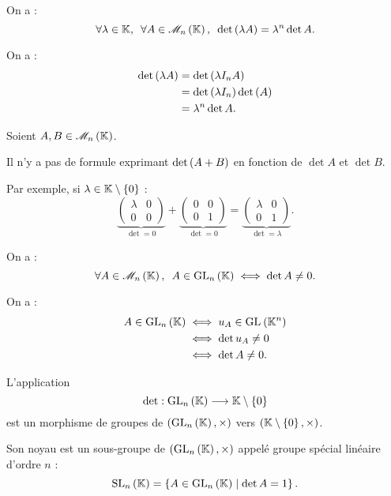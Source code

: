 \begin{prop}
On a : \[\quantifs{\forall\lambda\in\K;\forall A\in\M{n}}\det\paren{\lambda A}=\lambda^n\det A.\]
\end{prop}

\begin{dem}
On a : \[\begin{aligned}
\det\left(\lambda A\right)&=\det\left(\lambda I_nA\right) \\
&=\det\left(\lambda I_n\right)\det\left(A\right) \\
&=\lambda^n\det A.
\end{aligned}\]
\end{dem}

\begin{rem}
Soient \(A,B\in\M{n}\).

Il n'y a pas de formule exprimant \(\det\left(A+B\right)\) en fonction de \(\det A\) et \(\det B\).

Par exemple, si \(\lambda\in\mathbb{K}\setminus\left\lbrace0\right\rbrace\) : \[\underbrace{\begin{pmatrix}
\lambda & 0 \\
0 & 0
\end{pmatrix}}_{\det=0}+\underbrace{\begin{pmatrix}
0 & 0 \\
0 & 1
\end{pmatrix}}_{\det=0}=\underbrace{\begin{pmatrix}
\lambda & 0 \\
0 & 1
\end{pmatrix}}_{\det=\lambda}.\]
\end{rem}

\begin{prop}
On a : \[\quantifs{\forall A\in\M{n}}A\in\GL{n}\ssi\det A\not=0.\]
\end{prop}

\begin{dem}
On a : \[\begin{aligned}
A\in\GL{n}&\ssi u_A\in\GL{}[\K^n] \\
&\ssi\det u_A\not=0 \\
&\ssi\det A\not=0.
\end{aligned}\]
\end{dem}

\begin{defprop}
L'application \[\det:\GL{n}\to\K\excluant\accol{0}\] est un morphisme de groupes de \(\groupe{\GL{n}}[\times]\) vers \(\groupe{\K\excluant\accol{0}}[\times]\).

Son noyau est un sous-groupe de \(\groupe{\GL{n}}[\times]\) appelé groupe spécial linéaire d'ordre \(n\) : \[\SL{n}=\accol{A\in\GL{n}\tq\det A=1}.\]
\end{defprop}

